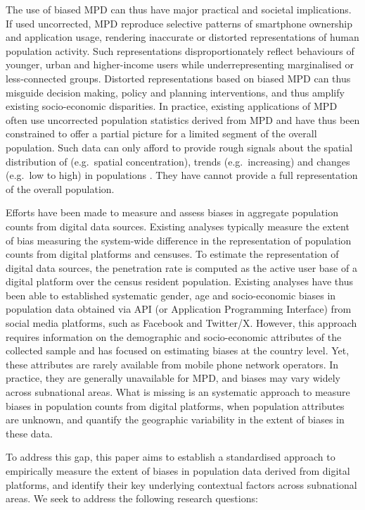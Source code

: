 \documentclass[]{rsos}%
\begin{document}
The use of biased MPD can thus have major practical and societal
implications. If used uncorrected, MPD reproduce selective patterns of
smartphone ownership and application usage, rendering inaccurate or
distorted representations of human population activity. Such
representations disproportionately reflect behaviours of younger, urban
and higher-income users while underrepresenting marginalised or
less-connected groups. Distorted representations based on biased MPD can
thus misguide decision making, policy and planning interventions, and
thus amplify existing socio-economic disparities. In practice, existing
applications of MPD often use uncorrected population statistics derived
from MPD and have thus been constrained to offer a partial picture for a
limited segment of the overall population. Such data can only afford to
provide rough signals about the spatial distribution of (e.g.~spatial
concentration), trends (e.g.~increasing) and changes (e.g.~low to high)
in populations \citep{rowe22-sensing-ukraine}. They have cannot provide a
full representation of the overall population.

Efforts have been made to measure and assess biases in aggregate
population counts from digital data sources. Existing analyses typically
measure the extent of bias measuring the system-wide difference in the
representation of population counts from digital platforms and censuses.
To estimate the representation of digital data sources, the penetration
rate is computed as the active user base of a digital platform over the
census resident population. Existing analyses have thus been able to
established systematic gender, age and socio-economic biases in
population data obtained via API (or Application Programming Interface)
from social media platforms, such as Facebook and Twitter/X. However,
this approach requires information on the demographic and socio-economic
attributes of the collected sample and has focused on estimating biases
at the country level. Yet, these attributes are rarely available from
mobile phone network operators. In practice, they are generally
unavailable for MPD, and biases may vary widely across subnational
areas. What is missing is an systematic approach to measure biases in
population counts from digital platforms, when population attributes are
unknown, and quantify the geographic variability in the extent of biases
in these data.

To address this gap, this paper aims to establish a standardised
approach to empirically measure the extent of biases in population data
derived from digital platforms, and identify their key underlying
contextual factors across subnational areas. We seek to address the
following research questions:
\end{document}

